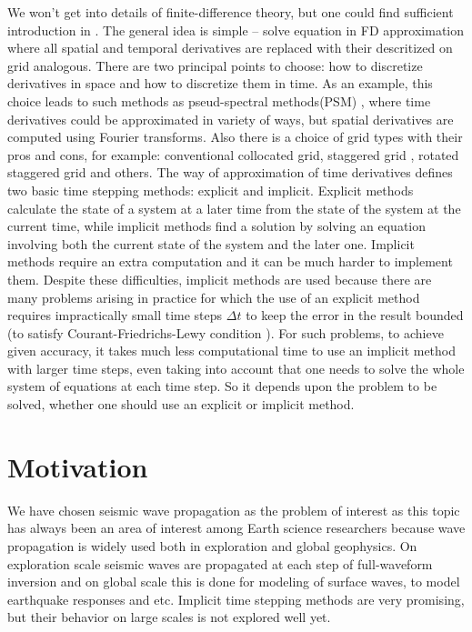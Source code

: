 \documentclass[12pt,a4paper]{report}
\begin{document}
We won't get into details of finite-difference theory, but one could find sufficient introduction in \cite{moczo2007finite}. The general idea is simple -- solve equation in FD approximation where all spatial and temporal derivatives are replaced with their descritized on grid analogous. There are two principal points to choose: how to discretize derivatives in space and how to discretize them in time. As an example, this choice leads to such methods as pseud-spectral methods(PSM) \citep{kosloff1982forward}, where time derivatives could be approximated in variety of ways, but spatial derivatives are computed using Fourier transforms. Also there is a choice of grid types with their pros and cons, for example: conventional collocated grid, staggered grid \cite{Virieux1984, Virieux1986}, rotated staggered grid \citep{saenger2000modeling} and others. The way of approximation of time derivatives defines two basic time stepping methods: explicit and implicit. Explicit methods calculate the state of a system at a later time from the state of the system at the current time, while implicit methods find a solution by solving an equation involving both the current state of the system and the later one. Implicit methods require an extra computation and it can be much harder to implement them. Despite these difficulties, implicit methods are used because there are many problems arising in practice for which the use of an explicit method requires impractically small time steps $\Delta t$ to keep the error in the result bounded (to satisfy Courant-Friedrichs-Lewy condition \citep{courant1928partiellen}). For such problems, to achieve given accuracy, it takes much less computational time to use an implicit method with larger time steps, even taking into account that one needs to solve the whole system of equations at each time step. So it depends upon the problem to be solved, whether one should use an explicit or implicit method.\\

\section*{Motivation}
We have chosen seismic wave propagation as the problem of interest as this topic has always been an area of interest among Earth science researchers because wave propagation is widely used both in exploration and global geophysics. On exploration scale seismic waves are propagated at each step of full-waveform inversion and on global scale this is done for modeling of surface waves, to model earthquake responses and etc. Implicit time stepping methods are very promising, but their behavior on large scales is not explored well yet.
\end{document}
